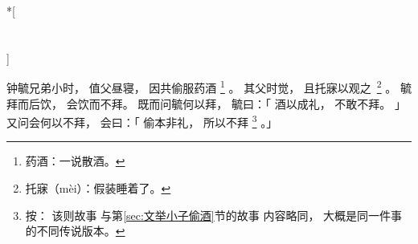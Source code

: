 
\switchcolumn[0]*[\section{}]

钟毓兄弟小时，
值父昼寝，
因共偷服药酒%
\footnote{%
    药酒：一说散酒。
}%
。
其父时觉，
且托寐以观\mbox{之%
\footnote{%
    托寐（mèi）：假装睡着了。
}}%
。
毓拜而后饮，
会饮而不拜。
既而问毓何以拜，
毓曰：「
    酒以成礼，
    不敢不拜。
」
又问会何以不拜，
会曰：「
    偷本非礼，
    所以不拜%
    \footnote{%
        按：
        该则故事
        与第\ref{sec:文举小子偷酒}节的故事
        内容略同，
        大概是同一件事的不同传说版本。
    }%
。」

\switchcolumn


